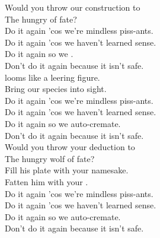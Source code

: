 



Would you throw our construction to \\
The hungry  of fate? \\

Do it again 'cos we're mindless piss-ants. \\
Do it again 'cos we haven't learned sense. \\
Do it again so we . \\
Don't do it again because it isn't safe. \\

 looms like a leering figure. \\
Bring our species into sight. \\

Do it again 'cos we're mindless piss-ants. \\
Do it again 'cos we haven't learned sense. \\
Do it again so we auto-cremate. \\
Don't do it again because it isn't safe. \\

Would you throw your deduction to \\
The hungry wolf of fate? \\
Fill his plate with your namesake. \\
Fatten him with your . \\

Do it again 'cos we're mindless piss-ants. \\
Do it again 'cos we haven't learned sense. \\
Do it again so we auto-cremate. \\
Don't do it again because it isn't safe. \\
